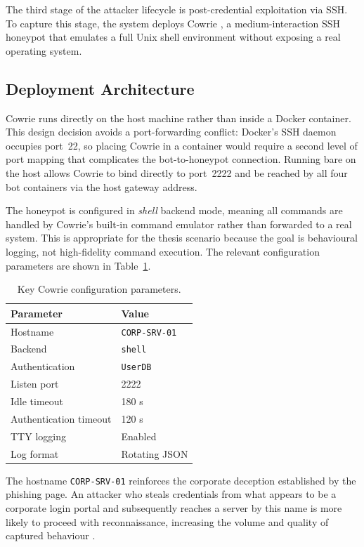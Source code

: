 The third stage of the attacker lifecycle is post-credential exploitation via
SSH\@. To capture this stage, the system deploys Cowrie \cite{Song2005HoneyStat},
a medium-interaction SSH honeypot that emulates a full Unix shell environment
without exposing a real operating system.

\subsection{Deployment Architecture}

Cowrie runs directly on the host machine rather than inside a Docker container.
This design decision avoids a port-forwarding conflict: Docker's SSH daemon
occupies port~22, so placing Cowrie in a container would require a second level
of port mapping that complicates the bot-to-honeypot connection. Running bare on
the host allows Cowrie to bind directly to port~2222 and be reached by all four
bot containers via the host gateway address.

The honeypot is configured in \emph{shell} backend mode, meaning all commands
are handled by Cowrie's built-in command emulator rather than forwarded to a
real system. This is appropriate for the thesis scenario because the goal is
behavioural logging, not high-fidelity command execution. The relevant
configuration parameters are shown in Table~\ref{tab:cowrie_cfg}.

\begin{table}[h]
\centering
\caption{Key Cowrie configuration parameters.}
\label{tab:cowrie_cfg}
\begin{tabular}{ll}
\hline
\textbf{Parameter} & \textbf{Value} \\
\hline
Hostname              & \texttt{CORP-SRV-01} \\
Backend               & \texttt{shell} \\
Authentication        & \texttt{UserDB} \\
Listen port           & 2222 \\
Idle timeout          & 180 s \\
Authentication timeout & 120 s \\
TTY logging           & Enabled \\
Log format            & Rotating JSON \\
\hline
\end{tabular}
\end{table}

The hostname \texttt{CORP-SRV-01} reinforces the corporate deception established
by the phishing page. An attacker who steals credentials from what appears to be
a corporate login portal and subsequently reaches a server by this name is more
likely to proceed with reconnaissance, increasing the volume and quality of
captured behaviour \cite{Holz2006AttackPatterns}.

